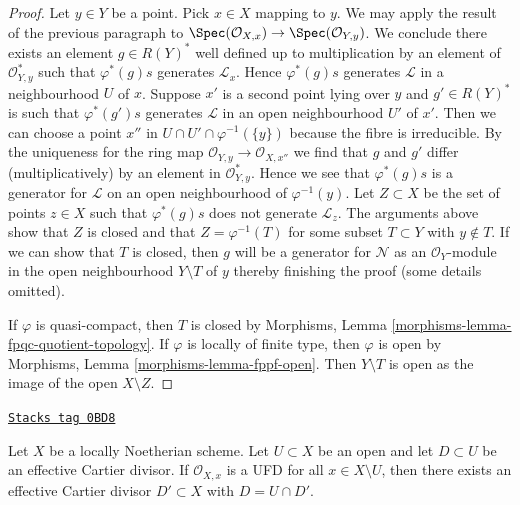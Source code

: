 \begin{proof}
\medskip\noindent
Let $y \in Y$ be a point.
Pick $x \in X$ mapping to $y$. We may apply the result of the previous
paragraph to $\Spec(\mathcal{O}_{X, x}) \to \Spec(\mathcal{O}_{Y, y})$.
We conclude there exists an element $g \in R(Y)^*$ well defined up to
multiplication by an element of $\mathcal{O}_{Y, y}^*$ such that
$\varphi^*(g)s$ generates $\mathcal{L}_x$. Hence $\varphi^*(g)s$
generates $\mathcal{L}$ in a neighbourhood $U$ of $x$.
Suppose $x'$ is a second point lying over $y$ and $g' \in R(Y)^*$ is
such that $\varphi^*(g')s$ generates $\mathcal{L}$ in an open neighbourhood
$U'$ of $x'$. Then we can choose a point
$x''$ in $U \cap U' \cap \varphi^{-1}(\{y\})$
because the fibre is irreducible. By the uniqueness for
the ring map $\mathcal{O}_{Y, y} \to \mathcal{O}_{X, x''}$
we find that $g$ and $g'$ differ (multiplicatively)
by an element in $\mathcal{O}_{Y, y}^*$. Hence we see that $\varphi^*(g)s$
is a generator for $\mathcal{L}$ on an open neighbourhood
of $\varphi^{-1}(y)$. Let $Z \subset X$ be the set of points
$z \in X$ such that $\varphi^*(g)s$ does not generate $\mathcal{L}_z$.
The arguments above show that $Z$ is closed and that $Z = \varphi^{-1}(T)$
for some subset $T \subset Y$ with $y \not \in T$. If we can show that
$T$ is closed, then $g$ will be a generator for $\mathcal{N}$ as an
$\mathcal{O}_Y$-module in the open neighbourhood $Y \setminus T$ of $y$
thereby finishing the proof (some details omitted).

\medskip\noindent
If $\varphi$ is quasi-compact, then $T$ is closed by
Morphisms, Lemma \ref{morphisms-lemma-fpqc-quotient-topology}.
If $\varphi$ is locally of finite type, then $\varphi$ is open
by Morphisms, Lemma \ref{morphisms-lemma-fppf-open}.
Then $Y \setminus T$ is open as the image of the open $X \setminus Z$.
\end{proof}

\begin{lemma}
\label{divisors-lemma-closure-effective-cartier-divisor}
\href{https://stacks.math.columbia.edu/tag/0BD8}{\texttt{Stacks tag 0BD8}}

Let $X$ be a locally Noetherian scheme. Let $U \subset X$ be
an open and let $D \subset U$ be an effective Cartier divisor.
If $\mathcal{O}_{X, x}$ is a UFD for all $x \in X \setminus U$,
then there exists an effective Cartier divisor $D' \subset X$
with $D = U \cap D'$.
\end{lemma}

